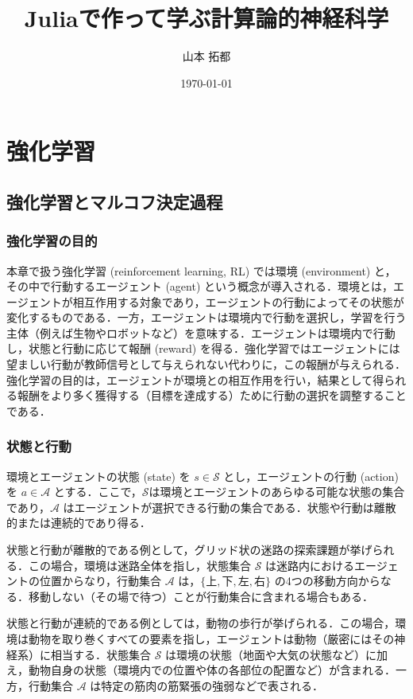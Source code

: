 \documentclass[titlepage]{ltjsbook}
\title{\Huge \textbf{Juliaで作って学ぶ計算論的神経科学}}
\author{\huge 山本 拓都}
\date{\huge \today}
\begin{document}
\setcounter{tocdepth}{2}
\tableofcontents
\clearpage
\chapter{強化学習}
\section{強化学習とマルコフ決定過程}
\subsection{強化学習の目的}
本章で扱う強化学習 (reinforcement learning, RL) では環境 (environment) と，その中で行動するエージェント (agent) という概念が導入される．環境とは，エージェントが相互作用する対象であり，エージェントの行動によってその状態が変化するものである．一方，エージェントは環境内で行動を選択し，学習を行う主体（例えば生物やロボットなど）を意味する．エージェントは環境内で行動し，状態と行動に応じて報酬 (reward) を得る．強化学習ではエージェントには望ましい行動が教師信号として与えられない代わりに，この報酬が与えられる．強化学習の目的は，エージェントが環境との相互作用を行い，結果として得られる報酬をより多く獲得する（目標を達成する）ために行動の選択を調整することである．

\subsection{状態と行動}
環境とエージェントの状態 (state) を $s\in \mathcal{S}$ とし，エージェントの行動 (action) を $a \in \mathcal{A}$ とする．ここで，$\mathcal{S}$は環境とエージェントのあらゆる可能な状態の集合であり，$\mathcal{A}$ はエージェントが選択できる行動の集合である．状態や行動は離散的または連続的であり得る．

状態と行動が離散的である例として，グリッド状の迷路の探索課題が挙げられる．この場合，環境は迷路全体を指し，状態集合 $\mathcal{S}$ は迷路内におけるエージェントの位置からなり，行動集合 $\mathcal{A}$ は，$\{上, 下, 左, 右\}$ の4つの移動方向からなる．移動しない（その場で待つ）ことが行動集合に含まれる場合もある．

状態と行動が連続的である例としては，動物の歩行が挙げられる．この場合，環境は動物を取り巻くすべての要素を指し，エージェントは動物（厳密にはその神経系）に相当する．状態集合 $\mathcal{S}$ は環境の状態（地面や大気の状態など）に加え，動物自身の状態（環境内での位置や体の各部位の配置など）が含まれる．一方，行動集合 $\mathcal{A}$ は特定の筋肉の筋緊張の強弱などで表される．
\end{document}
